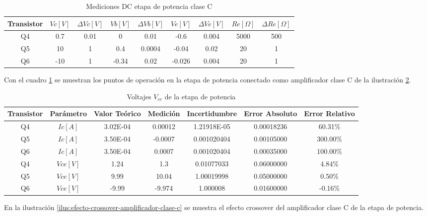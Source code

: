 \begin{table}[h!]
\centering
\begin{tabular}{|c|c|c|c|c|c|c|c|c|}
\hline
\textbf{Transistor} & \textbf{\(Vc[V]\)} & \textbf{\(\varDelta Vc[V]\)} & \textbf{\(Vb[V]\)} & \textbf{\(\varDelta Vb[V]\)} & \textbf{\(Ve[V]\)} & \textbf{\(\varDelta Ve[V]\)} & \textbf{\(Re[\Omega]\)} & \textbf{\(\varDelta Re[\Omega]\)} \\ \hline
Q4 & 0.7 & 0.01 & 0 & 0.01 & -0.6 & 0.004 & 5000 & 500 \\ \hline
Q5 & 10 & 1 & 0.4 & 0.0004 & -0.04 & 0.02 & 20 & 1 \\ \hline
Q6 & -10 & 1 & -0.34 & 0.02 & -0.026 & 0.004 & 20 & 1 \\ \hline
\end{tabular}
\caption{Mediciones DC etapa de potencia clase C}
\label{tab:med-dc-etapa-potencia-clase-c}
\end{table}

Con el cuadro \ref{tab:med-dc-etapa-potencia-clase-c} se muestran los puntos de operación en la etapa de potencia conectado como amplificador clase C de la ilustración \ref{tab:med-punto-estatico-etapa-potencia-clase-c}.

\begin{table}[h!]
\centering
\begin{tabular}{|c|c|c|c|c|c|c|}
\hline
\textbf{Transistor} & \textbf{Parámetro} & \textbf{Valor Teórico} & \textbf{Medición} & \textbf{Incertidumbre} & \textbf{Error Absoluto} & \textbf{Error Relativo} \\ \hline
Q4 & \(Ic [A]\) & 3.02E-04 & 0.00012 & 1.21918E-05 & 0.00018236 & 60.31\% \\ \hline
Q5 & \(Ic [A]\) & 3.50E-04 & -0.0007 & 0.001020404 & 0.00105000 & 300.00\% \\ \hline
Q6 & \(Ic [A]\) & 3.50E-04 & 0.0007 & 0.001020404 & 0.00035000 & 100.00\% \\ \hline
Q4 & \(Vce [V]\) & 1.24 & 1.3 & 0.01077033 & 0.06000000 & 4.84\% \\ \hline
Q5 & \(Vce [V]\) & 9.99 & 10.04 & 1.00019998 & 0.05000000 & 0.50\% \\ \hline
Q6 & \(Vce [V]\) & -9.99 & -9.974 & 1.000008 & 0.01600000 & -0.16\% \\ \hline
\end{tabular}
\caption{Voltajes \(V_{ce}\) de la etapa de potencia}
\label{tab:med-punto-estatico-etapa-potencia-clase-c}
\end{table}

En la ilustración \ref{ilus:efecto-crossover-amplificador-clase-c} se muestra el efecto crossover del amplificador clase C de la etapa de potencia.

